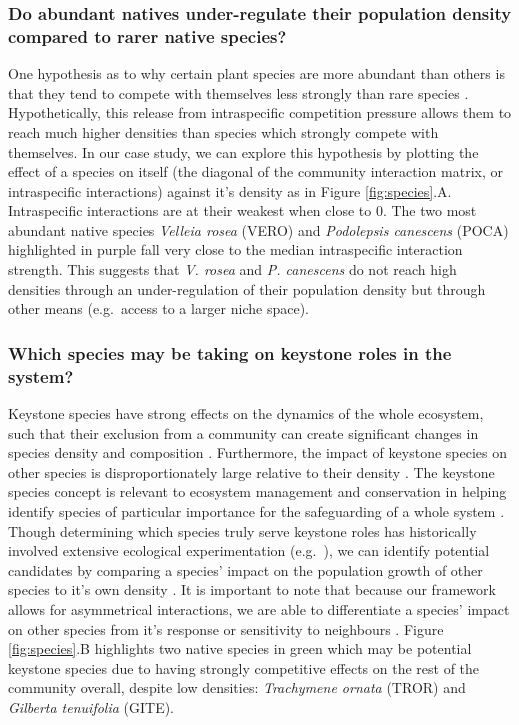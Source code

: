 \documentclass[a4,12pt]{article}
\begin{document}
\begin{refsection}
    \subsubsection*{Do abundant natives under-regulate their population density compared to rarer native species?}
    One hypothesis as to why certain plant species are more abundant than others is that they tend to compete with themselves less strongly than rare species \parencite{Yenni2012, Yenni2017}. Hypothetically, this release from intraspecific competition pressure allows them to reach much higher densities than species which strongly compete with themselves. In our case study, we can explore this hypothesis by plotting the effect of a species on itself (the diagonal of the community interaction matrix, or intraspecific interactions) against it's density as in Figure \ref{fig:species}.A. Intraspecific interactions are at their weakest when close to $0$. The two most abundant native species \textit{Velleia rosea} (VERO) and \textit{Podolepsis canescens} (POCA) highlighted in purple fall very close to the median intraspecific interaction strength. This suggests that \textit{V. rosea} and \textit{P. canescens} do not reach high densities through an under-regulation of their population density but through other means (e.g.\ access to a larger niche space). 

    \subsubsection*{Which species may be taking on keystone roles in the system?}
    Keystone species have strong effects on the dynamics of the whole ecosystem, such that their exclusion from a community can create significant changes in species density and composition \parencite{Paine1969}. Furthermore, the impact of keystone species on other species is disproportionately large relative to their density \parencite{Power1996, Piraino2002, Libralato2006}. The keystone species concept is  relevant to ecosystem management and conservation in helping identify species of particular importance for the safeguarding of a whole system \parencite{Soule2005a}. Though determining which species truly serve keystone roles has historically involved extensive ecological experimentation (e.g.\ \cite{Paine1992}), we can identify potential candidates by comparing a species' impact on the population growth of other species to it's own density \parencite{Libralato2006}. It is important to note that because our framework allows for asymmetrical interactions, we are able to differentiate a species' impact on other species from it's response or sensitivity to neighbours \parencite{Broekman2020}. Figure \ref{fig:species}.B highlights two native species in green which may be potential keystone species due to having strongly competitive effects on the rest of the community overall, despite  low densities: \textit{Trachymene ornata} (TROR) and \textit{Gilberta tenuifolia} (GITE). 
    


\end{refsection}
\end{document}
